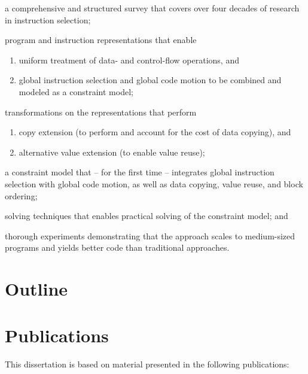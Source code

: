\begin{contributions}
  \item a comprehensive and structured survey that covers over four decades of
    research in instruction selection;
  \item program and instruction representations that enable
    \begin{enumerate}[label=\alph*)]
      \item uniform treatment of data- and control-flow operations, and
      \item global instruction selection and global code motion to be combined
        and modeled as a constraint model;
    \end{enumerate}
  \item transformations on the representations that perform
    \begin{enumerate}[label=\alph*)]
      \item copy extension (to perform and account for the cost of data
        copying), and
      \item alternative value extension (to enable value reuse);
    \end{enumerate}
  \item a constraint model that -- for the first time -- integrates global
    instruction selection with global code motion, as well as data copying,
    value reuse, and block ordering;
  \item solving techniques that enables practical solving of the constraint
    model; and
  \item thorough experiments demonstrating that the approach scales to
    medium-sized programs and yields better code than traditional approaches.
\end{contributions}


\section{Outline}


\section{Publications}

This dissertation is based on material presented in the following publications:

